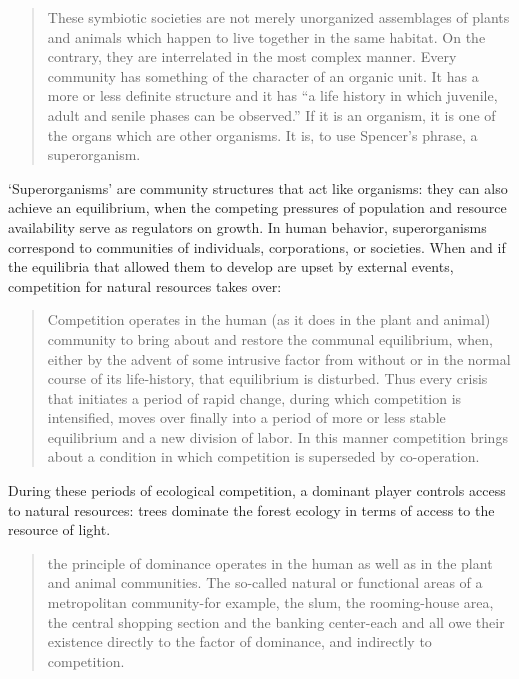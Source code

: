 \begin{quote}

These symbiotic societies are not merely unorganized assemblages of plants and animals which happen to live together in the same habitat. On the contrary, they are interrelated in the most complex manner. Every community has something of the character of an organic unit. It has a more or less definite structure and it has ``a life history in which juvenile, adult and senile phases can be observed.'' If it is an organism, it is one of the organs which are other organisms. It is, to use Spencer's phrase, a superorganism. ~\citep[P. 4]{Park:1936em}
\end{quote}

`Superorganisms' are community structures that act like organisms: they can also achieve an equilibrium, when the competing pressures of population and resource availability serve as regulators on growth. In human behavior, superorganisms correspond to communities of individuals, corporations, or societies. When and if the equilibria that allowed them to develop are upset by external events, competition for natural resources takes over:

\begin{quote}

Competition operates in the human (as it does in the plant and animal) community to bring about and restore the communal equilibrium, when, either by the advent of some intrusive factor from without or in the normal course of its life-history, that equilibrium is disturbed. Thus every crisis that initiates a period of rapid change, during which competition is intensified, moves over finally into a period of more or less stable equilibrium and a new division of labor. In this manner competition brings about a condition in which competition is superseded by co-operation. ~\citep[P.7]{Park:1936em}
\end{quote}

During these periods of ecological competition, a dominant player controls access to natural resources: trees dominate the forest ecology in terms of access to the resource of light. 

\begin{quote}

the principle of dominance operates in the human as well as in the plant and animal communities. The so-called natural or functional areas of a metropolitan community-for example, the slum, the rooming-house area, the central shopping section and the banking center-each and all owe their existence directly to the factor of dominance, and indirectly to competition. ~\citep[P.8]{Park:1936em}
\end{quote}

